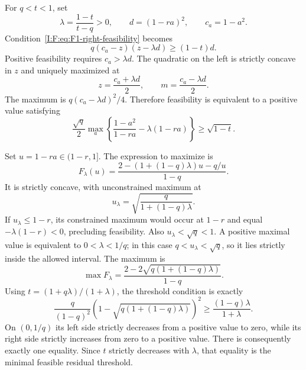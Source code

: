 For $q<t<1$, set
\[
 \lambda=\frac{1-t}{t-q}>0,\qquad
 d=(1-ra)^2,\qquad c_a=1-a^2.
\]
Condition~\eqref{I:F:eq:F1-right-feasibility} becomes
\begin{equation}
 q(c_a-z)(z-\lambda d)\ge(1-t)d.
 \label{I:F:eq:F1-concave-z}
\end{equation}
Positive feasibility requires $c_a>\lambda d$. The quadratic on the
left is strictly concave in $z$ and uniquely maximized at
\begin{equation}
 z=\frac{c_a+\lambda d}{2},\qquad
 m=\frac{c_a-\lambda d}{2}.
 \label{I:F:eq:F1-z-vertex}
\end{equation}
The maximum is $q(c_a-\lambda d)^2/4$. Therefore feasibility is equivalent
to a positive value satisfying
\begin{equation}
 \frac{\sqrt q}{2}
 \max_a\left\{\frac{1-a^2}{1-ra}-\lambda(1-ra)\right\}
 \ge\sqrt{1-t}.
 \label{I:F:eq:F1-residual-scalar}
\end{equation}

Set $u=1-ra\in(1-r,1]$. The expression to maximize is
\begin{equation}
 F_\lambda(u)
 =\frac{2-(1+(1-q)\lambda)u-q/u}{1-q}.
 \label{I:F:eq:F1-concave-u}
\end{equation}
It is strictly concave, with unconstrained maximum at
\[
 u_\lambda=\sqrt{\frac{q}{1+(1-q)\lambda}}.
\]
If $u_\lambda\le1-r$, its constrained maximum would occur at $1-r$
and equal $-\lambda(1-r)<0$, precluding feasibility. Also
$u_\lambda<\sqrt q<1$. A positive maximal value is equivalent to
$0<\lambda<1/q$; in this case $q<u_\lambda<\sqrt q$, so it lies
strictly inside the allowed interval. The maximum is
\[
 \max F_\lambda=
 \frac{2-2\sqrt{q(1+(1-q)\lambda)}}{1-q}.
\]
Using $t=(1+q\lambda)/(1+\lambda)$, the threshold condition is exactly
\begin{equation}
 \frac{q}{(1-q)^2}
 \left(1-\sqrt{q(1+(1-q)\lambda)}\right)^2
 \ge\frac{(1-q)\lambda}{1+\lambda}.
 \label{I:F:eq:F1-monotone-lambda}
\end{equation}
On $(0,1/q)$ its left side strictly decreases from a positive value to
zero, while its right side strictly increases from zero to a positive
value. There is consequently exactly one equality. Since $t$ strictly
decreases with $\lambda$, that equality is the minimal feasible residual
threshold.

